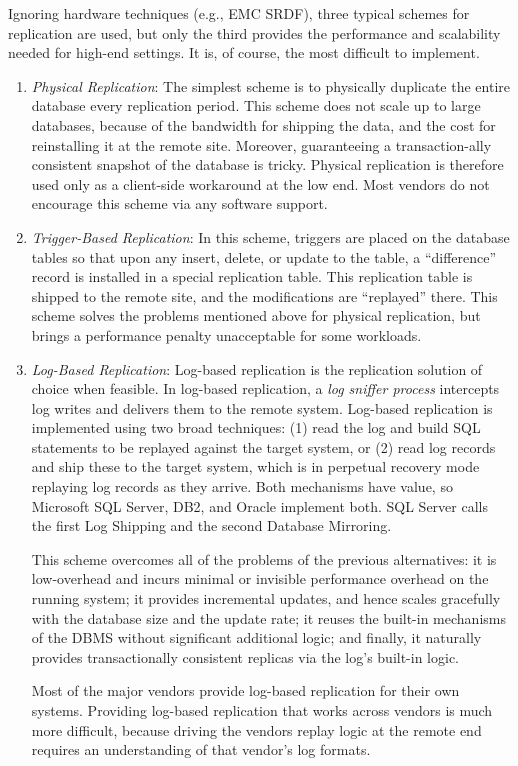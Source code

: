 \documentclass[a4paper,11pt,twoside,openright]{book}
\begin{document}
Ignoring hardware techniques (e.g., EMC SRDF), three typical schemes for
replication are used, but only the third provides the performance and
scalability needed for high-end settings. It is, of course, the most
difficult to implement.

\begin{enumerate}
\def\labelenumi{\arabic{enumi}.}
\item
  \emph{Physical Replication}: The simplest scheme is to physically
  duplicate the entire database every replication period. This scheme
  does not scale up to large databases, because of the bandwidth for
  shipping the data, and the cost for reinstalling it at the remote
  site. Moreover, guaranteeing a transaction-ally consistent snapshot of
  the database is tricky. Physical replication is therefore used only as
  a client-side workaround at the low end. Most vendors do not encourage
  this scheme via any software support.
\item
  \emph{Trigger-Based Replication}: In this scheme, triggers are placed
  on the database tables so that upon any insert, delete, or update to
  the table, a ``difference'' record is installed in a special
  replication table. This replication table is shipped to the remote
  site, and the modifications are ``replayed'' there. This scheme solves
  the problems mentioned above for physical replication, but brings a
  performance penalty unacceptable for some workloads.

\item
  \emph{Log-Based Replication}: Log-based replication is the
  replication solution of choice when feasible. In log-based
  replication, a \emph{log sniffer process} intercepts log writes and
  delivers them to the remote system. Log-based replication is
  implemented using two broad techniques: (1) read the log and build
  SQL statements to be replayed against the target system, or (2) read
  log records and ship these to the target system, which is in
  perpetual recovery mode replaying log records as they arrive. Both
  mechanisms have value, so Microsoft SQL Server, DB2, and Oracle
  implement both. SQL Server calls the first Log Shipping and the
  second Database Mirroring.

This scheme overcomes all of the problems of the previous alternatives:
it is low-overhead and incurs minimal or invisible performance overhead
on the running system; it provides incremental updates, and hence
scales gracefully with the database size and the update rate; it reuses
the built-in mechanisms of the DBMS without significant additional
logic; and finally, it naturally provides transactionally consistent
replicas via the log's built-in logic.

Most of the major vendors provide log-based replication for their own
systems. Providing log-based replication that works across vendors is
much more difficult, because driving the vendors replay logic at the
remote end requires an understanding of that vendor's log formats.
\end{enumerate}
\end{document}
